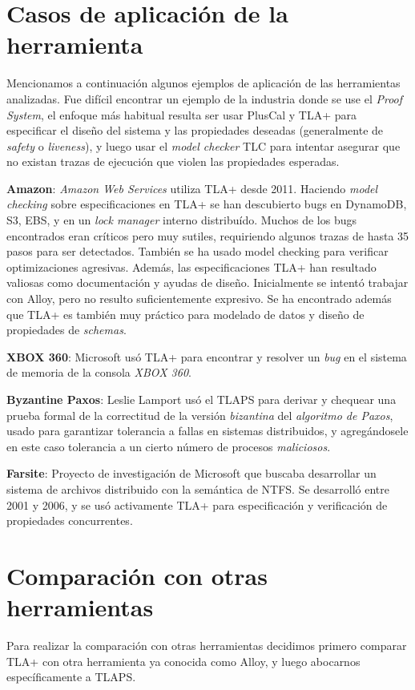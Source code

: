 \documentclass[spanish]{llncs}
\begin{document}
\section{Casos de aplicación de la herramienta}
Mencionamos a continuación algunos ejemplos de aplicación de las herramientas analizadas.
Fue difícil encontrar un ejemplo de la industria donde se use el \textit{Proof System}, el enfoque más habitual resulta ser usar PlusCal y TLA+ para especificar el diseño del sistema y las propiedades deseadas (generalmente de \textit{safety} o \textit{liveness}), y luego usar el \textit{model checker} TLC para intentar asegurar que no existan trazas de ejecución que violen las propiedades esperadas.

\textbf{Amazon}: \textit{Amazon Web Services} utiliza TLA+ desde 2011. Haciendo \textit{model checking} sobre especificaciones en TLA+ se han descubierto bugs
en DynamoDB, S3, EBS, y en un \textit{lock manager} interno distribuído.
Muchos de los bugs encontrados eran críticos pero muy sutiles, requiriendo algunos trazas de hasta 35 pasos para ser detectados.
También se ha usado model checking para verificar optimizaciones agresivas.
Además, las especificaciones TLA+ han resultado valiosas como documentación y ayudas de diseño.
Inicialmente se intentó trabajar con Alloy, pero no resulto suficientemente expresivo.
Se ha encontrado además que TLA+ es también muy práctico para modelado de datos y diseño de propiedades de \textit{schemas}. \cite{amazon}

\textbf{XBOX 360}: Microsoft usó TLA+ para encontrar y resolver un \textit{bug} en el sistema de memoria de la consola \textit{XBOX 360}. \cite{xbox360}

\textbf{Byzantine Paxos}: Leslie Lamport usó el TLAPS para derivar y chequear una prueba formal de la correctitud de la versión \textit{bizantina} del \textit{algoritmo de Paxos},
usado para garantizar tolerancia a fallas en sistemas distribuidos, y agregándosele en este caso tolerancia a un cierto número de procesos \textit{maliciosos}. \cite{byzpaxos}

\textbf{Farsite}: Proyecto de investigación de Microsoft que buscaba desarrollar un sistema de archivos distribuido con la semántica de NTFS.
Se desarrolló entre 2001 y 2006, y se usó activamente TLA+ para especificación y verificación de propiedades concurrentes. \cite{farsite}

\section{Comparación con otras herramientas}
Para realizar la comparación con otras herramientas decidimos primero comparar TLA+ con otra herramienta ya conocida como Alloy,
y luego abocarnos específicamente a TLAPS.
\end{document}
